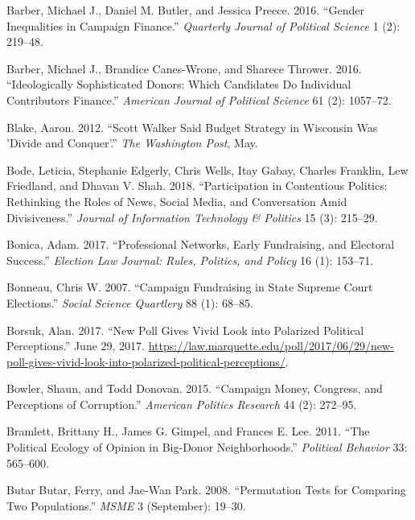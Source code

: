 \documentclass[12pt,]{article}
\begin{document}
\leavevmode\hypertarget{ref-barber2016b}{}%
Barber, Michael J., Daniel M. Butler, and Jessica Preece. 2016. ``Gender
Inequalities in Campaign Finance.'' \emph{Quarterly Journal of Political
Science} 1 (2): 219--48.

\leavevmode\hypertarget{ref-barber2016c}{}%
Barber, Michael J., Brandice Canes-Wrone, and Sharece Thrower. 2016.
``Ideologically Sophisticated Donors: Which Candidates Do Individual
Contributors Finance.'' \emph{American Journal of Political Science} 61
(2): 1057--72.

\leavevmode\hypertarget{ref-blake2012}{}%
Blake, Aaron. 2012. ``Scott Walker Said Budget Strategy in Wisconsin Was
'Divide and Conquer'.'' \emph{The Washington Post}, May.

\leavevmode\hypertarget{ref-bode2018}{}%
Bode, Leticia, Stephanie Edgerly, Chris Wells, Itay Gabay, Charles
Franklin, Lew Friedland, and Dhavan V. Shah. 2018. ``Participation in
Contentious Politics: Rethinking the Roles of News, Social Media, and
Conversation Amid Divisiveness.'' \emph{Journal of Information
Technology \& Politics} 15 (3): 215--29.

\leavevmode\hypertarget{ref-bonica2017}{}%
Bonica, Adam. 2017. ``Professional Networks, Early Fundraising, and
Electoral Success.'' \emph{Election Law Journal: Rules, Politics, and
Policy} 16 (1): 153--71.

\leavevmode\hypertarget{ref-bonneau2007}{}%
Bonneau, Chris W. 2007. ``Campaign Fundraising in State Supreme Court
Elections.'' \emph{Social Science Quartlery} 88 (1): 68--85.

\leavevmode\hypertarget{ref-borsuk2017}{}%
Borsuk, Alan. 2017. ``New Poll Gives Vivid Look into Polarized Political
Perceptions.'' June 29, 2017.
\url{https://law.marquette.edu/poll/2017/06/29/new-poll-gives-vivid-look-into-polarized-political-perceptions/}.

\leavevmode\hypertarget{ref-bowler2015}{}%
Bowler, Shaun, and Todd Donovan. 2015. ``Campaign Money, Congress, and
Perceptions of Corruption.'' \emph{American Politics Research} 44 (2):
272--95.

\leavevmode\hypertarget{ref-bramlett2011}{}%
Bramlett, Brittany H., James G. Gimpel, and Frances E. Lee. 2011. ``The
Political Ecology of Opinion in Big-Donor Neighborhoods.''
\emph{Political Behavior} 33: 565--600.

\leavevmode\hypertarget{ref-butar2008}{}%
Butar Butar, Ferry, and Jae-Wan Park. 2008. ``Permutation Tests for
Comparing Two Populations.'' \emph{MSME} 3 (September): 19--30.
\end{document}
